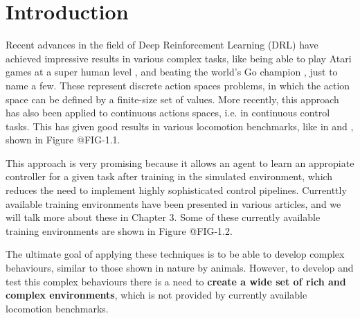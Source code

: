 \chapter{Introduction}
\label{ch:intro}



Recent advances in the field of Deep Reinforcement Learning (DRL) have achieved impressive
results in various complex tasks, like being able to play Atari games at a super human level \citep{DQNAtari}, 
and beating the world's Go champion \citep{AlphaGo}, just to name a few. These represent discrete 
action spaces problems, in which the action space can be defined by a finite-size set of values. 
More recently, this approach has also been applied to continuous actions spaces, i.e. in continuous 
control tasks. This has given good results in various locomotion benchmarks, like in 
\citeauthor{DeepmindEmergenceLocomotion} and \citeauthor{DeepMimic}, shown in Figure @FIG-1.1.

\figDrlLocomotionMotivation

This approach is very promising because it allows an agent to learn an appropiate controller for a given task after training in
the simulated environment, which reduces the need to implement highly sophisticated control pipelines. Currenttly available 
training environments have been presented in various articles, and we will talk more about these in Chapter 3.
Some of these currently available training environments are shown in Figure @FIG-1.2.


The ultimate goal of applying these techniques is to be able to develop complex behaviours, similar
to those shown in nature by animals. However, to develop and test this complex behaviours there is a need to \textbf{create
a wide set of rich and complex environments}, which is not provided by currently available locomotion benchmarks.

